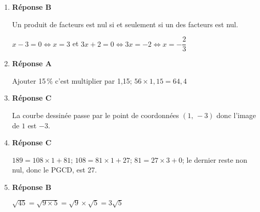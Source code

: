 


%

\begin{enumerate}
\item \textbf{Réponse B}

Un produit de facteurs est nul si et seulement si un des facteurs est nul.

$x-3=0 \iff x=3$ et $3x+2=0 \iff 3x=-2 \iff x=-\dfrac{2}{3}$

\item \textbf{Réponse A}

Ajouter 15\,\% c'est multiplier par 1,15; $56\times 1,15 = 64,4$

\item \textbf{Réponse C}

La courbe dessinée passe par le point de coordonnées $(1,\,-3)$ donc l'image de $1$ est $-3$.

\item \textbf{Réponse C}

$189=108\times 1 + 81$; $108 = 81\times 1 + 27$; $81=27\times 3+0$;
le dernier reste non nul, donc le PGCD, est 27.

\item \textbf{Réponse B}

$\sqrt{45}=\sqrt{9\times 5}=\sqrt{9}\times \sqrt{5}=3\sqrt{5}$

\end{enumerate}

\vspace{0,5cm}

